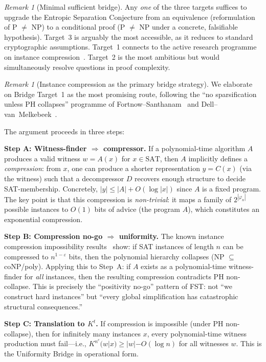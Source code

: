 \documentclass[aps,prd,twocolumn,superscriptaddress,nofootinbib]{revtex4-2}
\theoremstyle{definition}
\theoremstyle{remark}
\newtheorem{remark}[theorem]{Remark}
\begin{document}
\begin{remark}[Minimal sufficient bridge]
\label{rem:minimal-bridge}
Any \emph{one} of the three targets suffices to upgrade the Entropic Separation Conjecture from an equivalence (reformulation of P $\neq$ NP) to a conditional proof (P $\neq$ NP under a concrete, falsifiable hypothesis). Target~3 is arguably the most accessible, as it reduces to standard cryptographic assumptions. Target~1 connects to the active research programme on instance compression~\cite{Drucker2015}. Target~2 is the most ambitious but would simultaneously resolve questions in proof complexity.
\end{remark}

\begin{remark}[Instance compression as the primary bridge strategy]
\label{rem:compression-bridge}
We elaborate on Bridge Target~1 as the most promising route, following the ``no sparsification unless PH collapses'' programme of Fortnow--Santhanam~\cite{FortnowSanthanam2011} and Dell--van~Melkebeek~\cite{DellMelkebeek2014}.

The argument proceeds in three steps:

\textbf{Step A: Witness-finder $\Rightarrow$ compressor.}
If a polynomial-time algorithm $A$ produces a valid witness $w = A(x)$ for $x \in \mathrm{SAT}$, then $A$ implicitly defines a \emph{compression}: from $x$, one can produce a shorter representation $y = C(x)$ (via the witness) such that a decompressor $D$ recovers enough structure to decide SAT-membership. Concretely, $|y| \leq |A| + O(\log|x|)$ since $A$ is a fixed program. The key point is that this compression is \emph{non-trivial}: it maps a family of $2^{|\varphi_n|}$ possible instances to $O(1)$ bits of advice (the program $A$), which constitutes an exponential compression.

\textbf{Step B: Compression no-go $\Rightarrow$ uniformity.}
The known instance compression impossibility results~\cite{FortnowSanthanam2011,DellMelkebeek2014,Drucker2015} show: if SAT instances of length $n$ can be compressed to $n^{1-\varepsilon}$ bits, then the polynomial hierarchy collapses (NP $\subseteq$ coNP/poly). Applying this to Step~A: if $A$ exists as a polynomial-time witness-finder for \emph{all} instances, then the resulting compression contradicts PH non-collapse. This is precisely the ``positivity no-go'' pattern of FST: not ``we construct hard instances'' but ``every global simplification has catastrophic structural consequences.''

\textbf{Step C: Translation to $K^t$.}
If compression is impossible (under PH non-collapse), then for infinitely many instances $x$, every polynomial-time witness production must fail---i.e., $K^{n^c}(w | x) \geq |w| - O(\log n)$ for all witnesses $w$. This is the Uniformity Bridge in operational form.


\end{remark}
\end{document}
